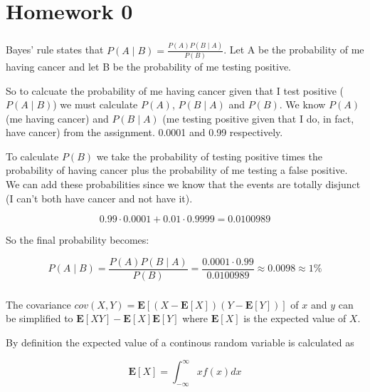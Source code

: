 \documentclass{article}
\begin{document}
\setcounter{section}{1}
\chapter{Homework 0}
\subsection{}

Bayes' rule states that $P(A\mid B) = \frac{P(A)P(B\mid A)}{P(B)}$. Let A be the
probability of me having cancer and let B be the probability of me testing
positive.

So to calcuate the probability of me having cancer given that I test positive
($P(A\mid B)$) we must calculate $P(A)$, $P(B\mid A)$ and $P(B)$.  We know
$P(A)$ (me having cancer) and $P(B\mid A)$ (me testing positive given that I
do, in fact, have cancer) from the assignment. 0.0001 and 0.99 respectively.

To calculate $P(B)$ we take the probability of testing positive times the
probability of having cancer plus the probability of me testing a false
positive. We can add these probabilities since we know that the events are
totally disjunct (I can't both have cancer and not have it).

\begin{equation*}
0.99 \cdot 0.0001 + 0.01 \cdot 0.9999 = 0.0100989
\end{equation*}

So the final probability becomes:

\begin{equation*}
  P(A\mid B) = \frac{P(A)P(B\mid A)}{P(B)} =
  \frac{0.0001 \cdot 0.99}{0.0100989} \approx 0.0098 \approx 1\%
\end{equation*}

\subsection{}

The covariance $cov(X,Y) = \mathbf{E}[(X - \mathbf{E}[X])(Y - \mathbf{E}[Y])]$
of $x$ and $y$ can be simplified to $\mathbf{E}[XY] -
\mathbf{E}[X]\mathbf{E}[Y]$ where $\mathbf{E}[X]$ is the expected value of $X$.

By definition the expected value of a continous random variable is calculated as

\begin{equation*}
  \mathbf{E}[X] = \int_{-\infty}^{\infty} x f(x) dx
\end{equation*}
\end{document}
